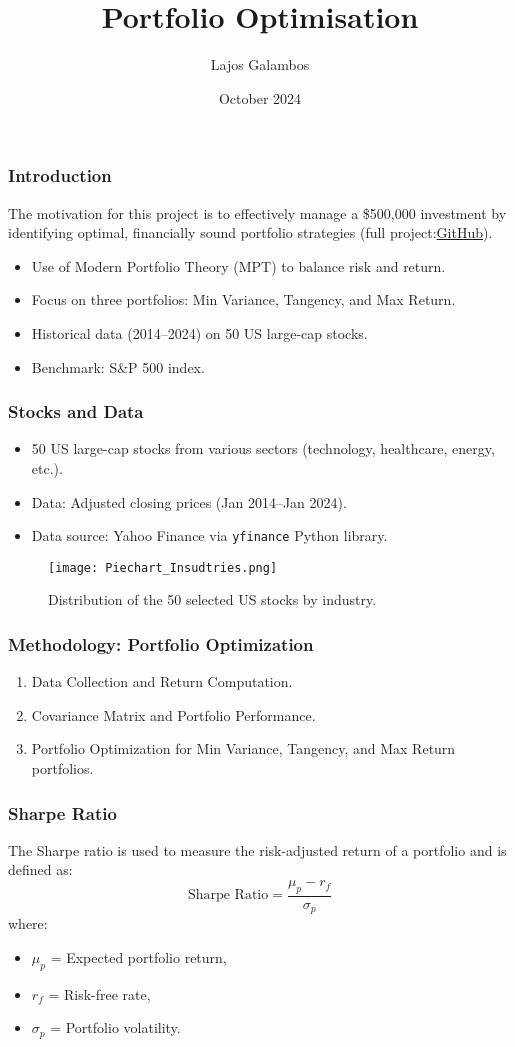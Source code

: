 \documentclass{beamer}
\title{Portfolio Optimisation}
\author{Lajos Galambos}
\date{October 2024}
\begin{document}
\frame{\titlepage}

\begin{frame}
\frametitle{Introduction}
The motivation for this project is to effectively manage a \$500,000 investment by identifying optimal, financially sound portfolio strategies (full project:\href{https://github.com/galamboslajos/Finance-Working-Files/blob/main/Portfolio_optimization_US}{GitHub}).
\begin{itemize}
    \item Use of Modern Portfolio Theory (MPT) to balance risk and return.
    \item Focus on three portfolios: Min Variance, Tangency, and Max Return.
    \item Historical data (2014–2024) on 50 US large-cap stocks.
    \item Benchmark: S\&P 500 index.
\end{itemize}
\end{frame}

\begin{frame}
\frametitle{Stocks and Data}
\begin{itemize}
    \item 50 US large-cap stocks from various sectors (technology, healthcare, energy, etc.).
    \item Data: Adjusted closing prices (Jan 2014–Jan 2024).
    \item Data source: Yahoo Finance via \texttt{yfinance} Python library.
\end{itemize}
\begin{figure}
    \centering
    \texttt{[image: Piechart\_Insudtries.png]}  %
    \caption{Distribution of the 50 selected US stocks by industry.}
\end{figure}
\end{frame}

\begin{frame}
\frametitle{Methodology: Portfolio Optimization}
\begin{enumerate}
    \item Data Collection and Return Computation.
    \item Covariance Matrix and Portfolio Performance.
    \item Portfolio Optimization for Min Variance, Tangency, and Max Return portfolios.
\end{enumerate}
\end{frame}

\begin{frame}
\frametitle{Sharpe Ratio}
The Sharpe ratio is used to measure the risk-adjusted return of a portfolio and is defined as:
\begin{equation}
\text{Sharpe Ratio} = \frac{\mu_p - r_f}{\sigma_p}
\end{equation}
where:
\begin{itemize}
    \item $\mu_p$ = Expected portfolio return,
    \item $r_f$ = Risk-free rate,
    \item $\sigma_p$ = Portfolio volatility.
\end{itemize}
\end{frame}
\end{document}

